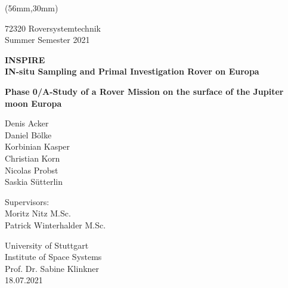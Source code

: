 %
%

\begin{titlepage}
	
	\begin{textblock*}{117mm}(56mm,30mm)
		
		\begin{center}
		
		
			72320 Roversystemtechnik \\
			Summer Semester 2021
			
			
			\vspace{20mm}
			
			\large \textbf{INSPIRE} \\ 
			\vspace{5mm}
			\large \textbf{IN-situ Sampling and Primal Investigation Rover on Europa}
			
			\vspace{20mm}
			
			\large \textbf{Phase 0/A-Study of a Rover Mission on the surface of the Jupiter moon Europa}
			
			\vspace{30mm}
			
			\normalsize 
			Denis Acker \\
			Daniel Bölke \\
			Korbinian Kasper \\
			Christian Korn \\
			Nicolas Probst \\
			Saskia Sütterlin \\
			
			
			\vspace{40mm}
			
			Supervisors: \\
			Moritz Nitz M.Sc. \\
			Patrick Winterhalder M.Sc. 
			
			\vspace{20mm}
			
			University of Stuttgart \\
			Institute of Space Systems \\
			Prof. Dr. Sabine Klinkner \\
			18.07.2021
			
		\end{center}
	
	\end{textblock*}
	
\end{titlepage}




